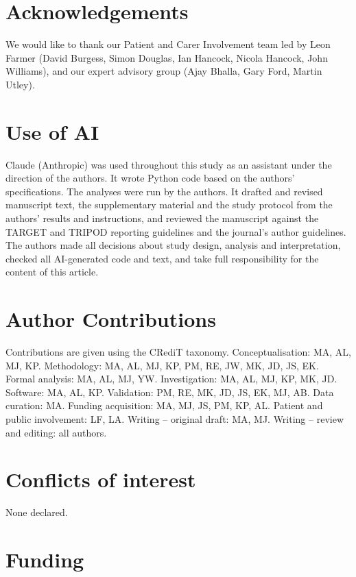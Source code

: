 \section*{Acknowledgements}

We would like to thank our Patient and Carer Involvement team led by Leon Farmer (David Burgess, Simon Douglas, Ian Hancock, Nicola Hancock, John Williams), and our expert advisory group (Ajay Bhalla, Gary Ford, Martin Utley).

\section*{Use of AI}

Claude (Anthropic) was used throughout this study as an assistant under the direction of the authors. It wrote Python code based on the authors' specifications. The analyses were run by the authors. It drafted and revised manuscript text, the supplementary material and the study protocol from the authors' results and instructions, and reviewed the manuscript against the TARGET and TRIPOD reporting guidelines and the journal's author guidelines. The authors made all decisions about study design, analysis and interpretation, checked all AI-generated code and text, and take full responsibility for the content of this article.

\section*{Author Contributions}

Contributions are given using the CRediT taxonomy. Conceptualisation: MA, AL, MJ, KP. Methodology: MA, AL, MJ, KP, PM, RE, JW, MK, JD, JS, EK. Formal analysis: MA, AL, MJ, YW. Investigation: MA, AL, MJ, KP, MK, JD. Software: MA, AL, KP. Validation: PM, RE, MK, JD, JS, EK, MJ, AB. Data curation: MA. Funding acquisition: MA, MJ, JS, PM, KP, AL.   Patient and public involvement: LF, LA. Writing -- original draft: MA, MJ. Writing -- review and editing: all authors.

\section*{Conflicts of interest}

None declared. 

\section*{Funding}

